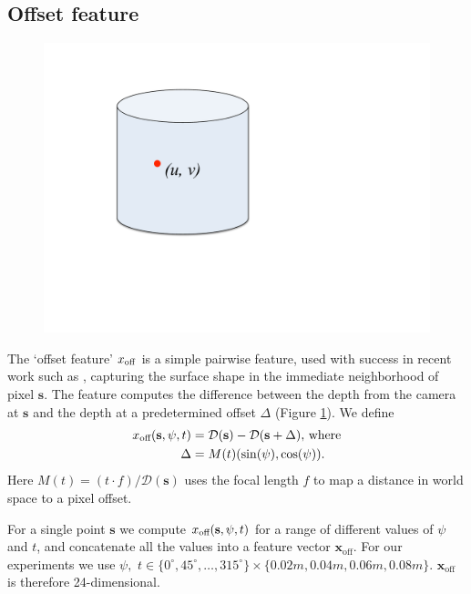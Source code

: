 \documentclass[10pt,twocolumn,letterpaper]{article}
\newcommand{\degree}{^{\circ}}
\newcommand{\feat}{\mathbf{x}}
\newcommand{\rgbdimage}{\mathcal{D}}
\newcommand{\pixelidx}{\mathbf{s}}
\begin{document}
\subsection{Offset feature}
\begin{figure}
  \vspace{-20pt}
  \centering
    \includegraphics[width=0.35\columnwidth, clip=true, trim=130 210 340 80, page=9]{spider_cobweb}
    \vspace{-10pt}
  \caption{}%
    \label{fig:offset_feature}
\end{figure}
The `offset feature' $x_\text{off}$ is a simple pairwise feature, used with success in recent work such as \cite{shotton-cvpr-2011}, capturing the surface shape in the immediate neighborhood of pixel $\pixelidx$.
The feature computes the difference between the depth from the camera at $\pixelidx$ and the depth at a predetermined offset $\Delta$ (Figure \ref{fig:offset_feature}). We define
\begin{align}
\scalfeat_\text{off} (\pixelidx, \psi, t) &= \rgbdimage(\pixelidx) - \rgbdimage(\pixelidx + \Delta), \, \text{where} \\
\Delta &= M(t) (\sin(\psi), \cos(\psi)).
\end{align}
Here $M(t) = (t\cdotp f)/\rgbdimage(\pixelidx)$ uses the focal length $f$ to map a distance in world space to a pixel offset.

For a single point $\pixelidx$ we compute $\scalfeat_\text{off} (\pixelidx, \psi, t)$ for a range of different values of $\psi$ and $t$, and concatenate all the values into a feature vector $\feat_{\text{off}}$.
For our experiments we use $\psi, \,\, t \in \{0\degree, 45\degree, \ldots, 315\degree\} \times \{0.02m, 0.04m, 0.06m, 0.08m\}$.
$\feat_{\text{off}}$ is therefore 24-dimensional.

\end{document}
